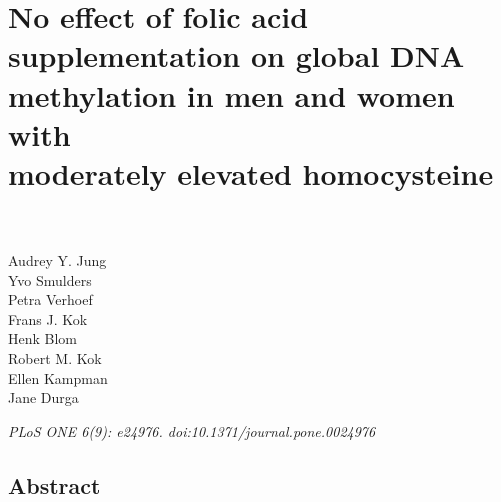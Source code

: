 \chapter[No effect of folic acid supplementation on global DNA methylation in men and women with moderately elevated homocysteine]{No effect of folic acid supplementation on global DNA methylation in men and women with \\ moderately elevated homocysteine}
\label{chap4_FACIT} 

\quad\\

\quad\\
\noindent
Audrey Y. Jung\\ 
Yvo Smulders\\ 
Petra Verhoef\\ 
Frans J. Kok\\ 
Henk Blom\\ 
Robert M. Kok\\ 
Ellen Kampman\\ 
Jane Durga\\ 

\begin{table}[b]
\emph{PLoS ONE 6(9): e24976. doi:10.1371/journal.pone.0024976}
\end{table}

\newpage 

\section*{Abstract}

